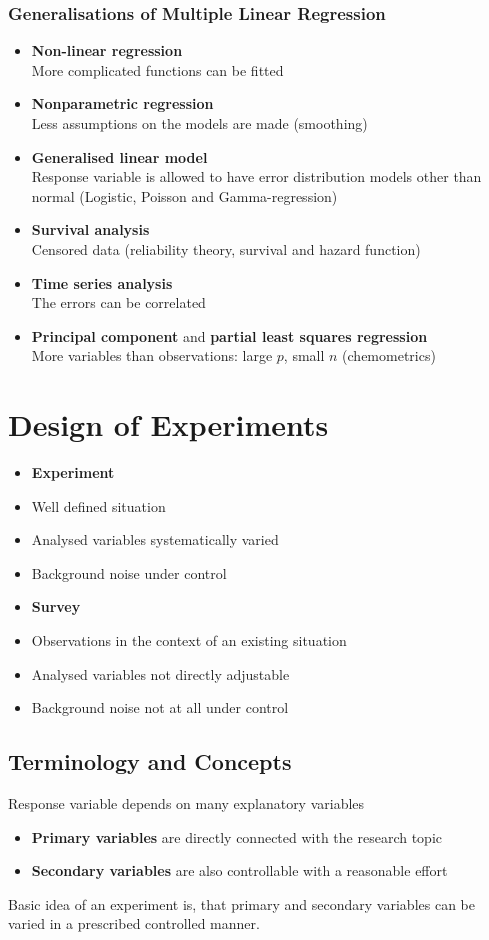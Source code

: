 \documentclass[11pt]{article}
\theoremstyle{definition}
\begin{document}
\subsubsection{Generalisations of Multiple Linear Regression}
\begin{itemize}
	\item \textbf{Non-linear regression}\\
	More complicated functions can be fitted
	\item \textbf{Nonparametric regression}\\
	Less assumptions on the models are made (smoothing)
	\item \textbf{Generalised linear model}\\
	Response variable is allowed to have error distribution models other than normal (Logistic, Poisson and Gamma-regression)
	\item \textbf{Survival analysis}\\
	Censored data (reliability theory, survival and hazard function)
	\item \textbf{Time series analysis}\\
	The errors can be correlated
	\item \textbf{Principal component} and \textbf{partial least squares regression}\\
	More variables than observations: large $p$, small $n$ (chemometrics)
\end{itemize}

\section{Design of Experiments}
\begin{itemize}
	\item[] \textbf{Experiment}
	\item Well defined situation
	\item Analysed variables systematically varied
	\item Background noise under control
	\item[] \textbf{Survey}
	\item Observations in the context of an existing situation
	\item Analysed variables not directly adjustable
	\item Background noise not at all under control
\end{itemize}

\subsection{Terminology and Concepts}
Response variable depends on many explanatory variables
\begin{itemize}
	\item \textbf{Primary variables} are directly connected with the research topic
	\item \textbf{Secondary variables} are also controllable with a reasonable effort
\end{itemize}
Basic idea of an experiment is, that primary and secondary variables can be varied in a prescribed controlled manner.
\end{document}
